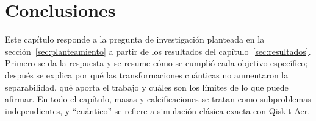
\newpage
\section{Conclusiones}
\label{sec:conclusiones}

Este capítulo responde a la pregunta de investigación planteada en la
sección~\ref{sec:planteamiento} a partir de los resultados del capítulo~\ref{sec:resultados}.
Primero se da la respuesta y se resume cómo se cumplió cada objetivo específico; después se explica
por qué las transformaciones cuánticas no aumentaron la separabilidad, qué aporta el trabajo y cuáles
son los límites de lo que puede afirmar. En todo el capítulo, masas y calcificaciones se tratan como
subproblemas independientes, y ``cuántico'' se refiere a simulación clásica exacta con Qiskit Aer.

